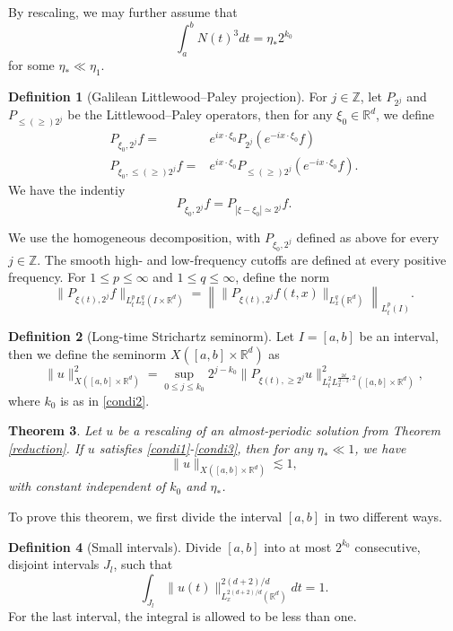 \documentclass[reqno,11pt]{amsart}
\theoremstyle{plain}
\newtheorem{theorem}{Theorem}
\theoremstyle{definition}
\newtheorem{definition}[theorem]{Definition}
\numberwithin{equation}{section}
\numberwithin{theorem}{section}
\def\geq{\geqslant}
\def\leq{\leqslant}
\def\R{\mathbb{R}}
\begin{document}
By rescaling, we may further assume that  
\begin{equation}\label{condi3}
\int_a^b N(t)^3  dt = \eta_{\ast} 2^{k_0}
\end{equation}
for some $\eta_{\ast}\ll \eta_1$.
\begin{definition}[Galilean Littlewood–Paley projection]
For $j\in\mathbb Z$, let $P_{2^j}$ and $P_{\leq(\geq) 2^j}$ be the Littlewood–Paley operators, then for any $\xi_0\in\R^d$, we define  
\begin{align*}
P_{\xi_0,2^j}f =& e^{ix\cdot \xi_0} P_{2^j} \left( e^{-ix\cdot \xi_0} f \right)\\
P_{\xi_0,\leq(\geq)2^j}f =& e^{ix\cdot \xi_0} P_{\leq(\geq) 2^j} \left( e^{-ix\cdot \xi_0} f \right).
\end{align*}
We have the indentiy
\begin{equation}\label{equ:GaLP}
P_{\xi_0,2^j}f=P_{|\xi-\xi_0|\simeq 2^j}f.
\end{equation}
\end{definition}


We use the homogeneous decomposition, with $P_{\xi_0,2^j}$ defined as above for every $j\in\mathbb Z$. The smooth high- and low-frequency cutoffs are defined at every positive frequency. For  $1 \leq p \leq \infty$  and $1 \leq q \leq \infty$, define the norm
\[
\|P_{\xi(t),2^j}f\|_{L_t^p L_x^q (I \times \mathbb{R}^d)} = \left\| \|P_{\xi(t),2^j}f(t,x)\|_{L_x^q (\mathbb{R}^d)} \right\|_{L_t^p (I)}. 
\]

\begin{definition}[Long-time Strichartz seminorm] Let $I=[a,b]$ be an interval, then we define the seminorm $X([a,b]\times\R^d)$ as
\[
\|u\|_{X([a,b]\times\R^d)}^2 = \sup_{0 \leq j \leq k_0} 2^{j-k_0} \|P_{\xi(t),\geq 2^j}u\|_{L_t^2 L_x^{\frac{2d}{d-2},2} ([a,b] \times \mathbb{R}^d)}^2,
\]
where $k_0$ is as in \eqref{condi2}.
\end{definition}

\begin{theorem}\label{longtime}
    Let $u$ be a rescaling of an almost-periodic solution from Theorem \ref{reduction}. If $u$ satisfies \eqref{condi1}-\eqref{condi3}, then for any $\eta_{\ast}\ll 1$, we have
\begin{equation}
    \|u\|_{X([a,b]\times\R^d)} \lesssim 1,
\end{equation}
with constant independent of $k_0$ and $\eta_{\ast}$.
\end{theorem}

To prove this theorem, we first divide the interval $[a,b]$ in two different ways.
\begin{definition}[Small intervals]
    Divide $[a,b]$ into at most $2^{k_0}$ consecutive, disjoint intervals $J_l$, such that
\[\int_{J_l} \|u(t)\|_{L_x^{2(d+2)/d}(\mathbb{R}^d)}^{2(d+2)/d} dt = 1.\]
For the last interval, the integral is allowed to be less than one.
\end{definition}
\end{document}
